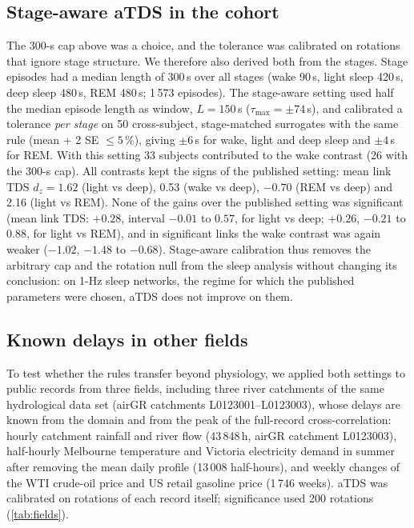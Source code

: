 \documentclass[11pt,a4paper]{article}
\begin{document}
\subsection{Stage-aware aTDS in the cohort}
\label{sec:res-stage}
The 300-s cap above was a choice, and the tolerance was calibrated on rotations that ignore stage structure. We therefore also derived both from the stages. Stage episodes had a median length of 300\,s over all stages (wake 90\,s, light sleep 420\,s, deep sleep 480\,s, REM 480\,s; 1\,573 episodes). The stage-aware setting used half the median episode length as window, $L = 150$\,s ($\tau_{\max} = \pm74$\,s), and calibrated a tolerance \emph{per stage} on 50 cross-subject, stage-matched surrogates with the same rule (mean + 2 SE $\le 5$\,\%), giving $\pm6$\,s for wake, light and deep sleep and $\pm4$\,s for REM. With this setting 33 subjects contributed to the wake contrast (26 with the 300-s cap). All contrasts kept the signs of the published setting: mean link TDS $d_z = 1.62$ (light vs deep), 0.53 (wake vs deep), $-0.70$ (REM vs deep) and 2.16 (light vs REM). None of the gains over the published setting was significant (mean link TDS: $+0.28$, interval $-0.01$ to $0.57$, for light vs deep; $+0.26$, $-0.21$ to $0.88$, for light vs REM), and in significant links the wake contrast was again weaker ($-1.02$, $-1.48$ to $-0.68$). Stage-aware calibration thus removes the arbitrary cap and the rotation null from the sleep analysis without changing its conclusion: on 1-Hz sleep networks, the regime for which the published parameters were chosen, aTDS does not improve on them.

\subsection{Known delays in other fields}
\label{sec:res-fields}
To test whether the rules transfer beyond physiology, we applied both settings to public records from three fields, including three river catchments of the same hydrological data set (airGR catchments L0123001--L0123003), whose delays are known from the domain and from the peak of the full-record cross-correlation: hourly catchment rainfall and river flow (43\,848\,h, airGR catchment L0123003), half-hourly Melbourne temperature and Victoria electricity demand in summer after removing the mean daily profile (13\,008 half-hours), and weekly changes of the WTI crude-oil price and US retail gasoline price (1\,746 weeks). aTDS was calibrated on rotations of each record itself; significance used 200 rotations (\cref{tab:fields}).
\end{document}
